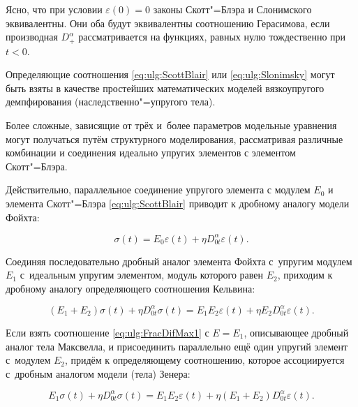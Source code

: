 Ясно, что при условии $\varepsilon(0)=0$ законы Скотт"=Блэра и Слонимского эквивалентны. Они оба будут эквивалентны соотношению Герасимова, если производная $D^{\alpha}_{+}$ рассматривается на функциях, равных нулю тождественно при $t<0$.



Определяющие соотношения \eqref{eq:ulg:ScottBlair} или \eqref{eq:ulg:Slonimsky} могут быть взяты в качестве простейших математических моделей вязкоупругого демпфирования (наследственно"=упругого тела). 

Более сложные, зависящие от трёх и~более параметров модельные уравнения могут получаться путём структурного моделирования, рассматривая различные комбинации и соединения идеально упругих элементов с элементом Скотт"=Блэра.



Действительно, параллельное соединение упругого элемента с модулем $E_{0}$ и элемента Скотт"=Блэра \eqref{eq:ulg:ScottBlair} приводит к дробному аналогу модели Фойхта:

\begin{equation}\label{eq:ulg:FracDifVoigt}

\sigma(t)=E_{0}\varepsilon(t)+\eta D^{\alpha}_{0t}\varepsilon(t).

\end{equation}



Соединяя последовательно дробный аналог элемента Фойхта с~упругим модулем $E_{1}$ с~идеальным упругим элементом, модуль которого равен $E_{2}$, приходим к дробному аналогу определяющего соотношения Кельвина:

\begin{equation}\label{eq:ulg:FracDifKelvin}

(E_{1}+E_{2})\sigma(t)+\eta D^{\alpha}_{0t}\sigma(t)=E_{1}E_{2}\varepsilon(t)+\eta E_{2}D^{\alpha}_{0t}\varepsilon(t).

\end{equation}



Если взять соотношение \eqref{eq:ulg:FracDifMax1} с $E=E_{1}$, описывающее дробный аналог тела Максвелла, и присоединить параллельно ещё один упругий элемент с~модулем $E_{2}$, придём к определяющему соотношению, которое ассоциируется с~дробным аналогом модели (тела) Зенера:

\begin{equation}\label{eq:ulg:FracDifZener}

E_{1}\sigma(t)+\eta D^{\alpha}_{0t}\sigma(t)=E_{1}E_{2}\varepsilon(t)+\eta(E_{1}+E_{2})D^{\alpha}_{0t}\varepsilon(t).

\end{equation}



